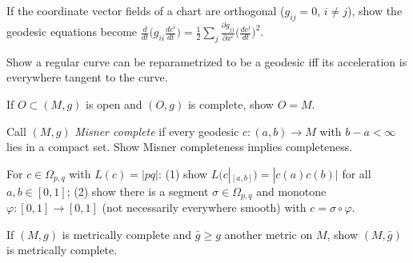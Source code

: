 \begin{remark}
  \label{rem:pet-ch5-ex-3}

  If the coordinate vector fields of a chart are orthogonal ($g_{ij}=0$, $i\ne j$),
  show the geodesic equations become
  $\frac{d}{dt}\big(g_{ii}\frac{dc^i}{dt}\big)=\frac12\sum_j\frac{\partial g_{jj}}
  {\partial x^i}\big(\frac{dc^j}{dt}\big)^2$.
\end{remark}

\begin{remark}
  \label{rem:pet-ch5-ex-4}

  Show a regular curve can be reparametrized to be a geodesic iff its acceleration
  is everywhere tangent to the curve.
\end{remark}

\begin{remark}
  \label{rem:pet-ch5-ex-5}

  If $O\subset(M,g)$ is open and $(O,g)$ is complete, show $O=M$.
\end{remark}

\begin{remark}
  \label{rem:pet-ch5-ex-6}

  Call $(M,g)$ \emph{Misner complete} if every geodesic $c:(a,b)\to M$ with
  $b-a<\infty$ lies in a compact set. Show Misner completeness implies
  completeness.
\end{remark}

\begin{remark}
  \label{rem:pet-ch5-ex-7}

  For $c\in\Omega_{p,q}$ with $L(c)=|pq|$: (1) show $L(c|_{[a,b]})=|c(a)c(b)|$ for
  all $a,b\in[0,1]$; (2) show there is a segment $\sigma\in\Omega_{p,q}$ and
  monotone $\varphi:[0,1]\to[0,1]$ (not necessarily everywhere smooth) with
  $c=\sigma\circ\varphi$.
\end{remark}

\begin{remark}
  \label{rem:pet-ch5-ex-8}

  If $(M,g)$ is metrically complete and $\bar g\ge g$ another metric on $M$, show
  $(M,\bar g)$ is metrically complete.
\end{remark}

